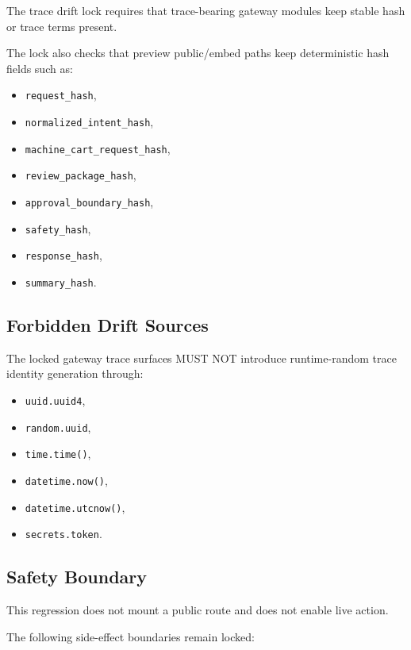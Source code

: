 The trace drift lock requires that trace-bearing gateway modules keep stable
hash or trace terms present.

The lock also checks that preview public/embed paths keep deterministic hash
fields such as:

\begin{itemize}
  \item \texttt{request\_hash},
  \item \texttt{normalized\_intent\_hash},
  \item \texttt{machine\_cart\_request\_hash},
  \item \texttt{review\_package\_hash},
  \item \texttt{approval\_boundary\_hash},
  \item \texttt{safety\_hash},
  \item \texttt{response\_hash},
  \item \texttt{summary\_hash}.
\end{itemize}

\subsection{Forbidden Drift Sources}

The locked gateway trace surfaces MUST NOT introduce runtime-random trace
identity generation through:

\begin{itemize}
  \item \texttt{uuid.uuid4},
  \item \texttt{random.uuid},
  \item \texttt{time.time()},
  \item \texttt{datetime.now()},
  \item \texttt{datetime.utcnow()},
  \item \texttt{secrets.token}.
\end{itemize}

\subsection{Safety Boundary}

This regression does not mount a public route and does not enable live action.

The following side-effect boundaries remain locked:

